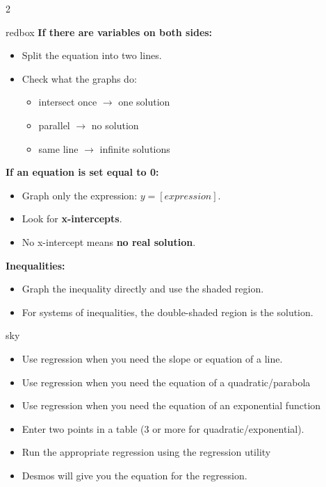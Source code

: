 \documentclass[10pt]{article}
\begin{document}
\begin{multicols}{2}
\begin{skillbox}{redbox}
            \textbf{If there are variables on both sides:}
            \begin{itemize}[noitemsep, topsep=0pt]
                \item Split the equation into two lines.
                \item Check what the graphs do:
                \begin{itemize}
                    \item intersect once $\rightarrow$ one solution
                    \item parallel $\rightarrow$ no solution
                    \item same line $\rightarrow$ infinite solutions
                \end{itemize}
            \end{itemize}

            \textbf{If an equation is set equal to 0:}
            \begin{itemize}
                \item Graph only the expression: $y=[expression]$.
                \item Look for \textbf{x-intercepts}.
                \item No x-intercept means \textbf{no real solution}.
            \end{itemize}

            \textbf{Inequalities:}
            \begin{itemize}
                \item Graph the inequality directly and use the shaded region.
                \item For systems of inequalities, the double-shaded region is the solution.
            \end{itemize}
        \end{skillbox}

        \begin{skillbox}{sky}
            \begin{itemize}
                \item {Use regression when you need the slope or equation of a line.}
                \item {Use regression when you need the equation of a quadratic/parabola}
                \item {Use regression when you need the equation of an exponential function}
            \end{itemize}
            \begin{itemize}
                \item Enter two points in a table (3 or more for quadratic/exponential).
                \item Run the appropriate regression using the regression utility
                \item Desmos will give you the equation for the regression.
            \end{itemize}


\end{skillbox}
\end{multicols}
\end{document}
